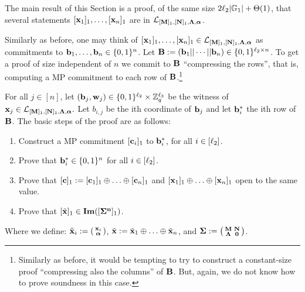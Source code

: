 The main result of this Section is a proof, of the same size $2{\ell_2}|\mathbb{G}_1|+\Theta(1)$, that several statements $[\mathbf{x}_1]_1,\ldots,[\mathbf{x}_n]_1$ are in $\mathcal{L}_{[\mathbf{{M}}]_1,[\mathbf{{N}}]_1,\mathbf{{\Lambda}},{\boldsymbol \alpha}}$.

Similarly as before, one may think of $[\mathbf{x}_1]_1,\ldots,[\mathbf{x}_n]_1\in{\mathcal{L}_{[\mathbf{{M}}]_1,[\mathbf{{N}}]_1,\mathbf{{\Lambda}},{\boldsymbol \alpha}}}$ as commitments to $\mathbf{b}_1,\ldots,\mathbf{b}_n\in\{0,1\}^n$. Let $\mathbf{{B}}:=(\mathbf{b}_1||\cdots||\mathbf{b}_n)\in\{0,1\}^{{\ell_2}\times n}$. To get a proof of size independent of $n$ we commit to $\mathbf{{B}}$ ``compressing the rows'', that is, computing a MP commitment to each row of $\mathbf{{B}}$.\footnote{Similarly as before, it would be tempting to try to construct a constant-size proof ``compressing also the columns'' of $\mathbf{{B}}$. But, again, we do not know how to prove soundness in this case.}
 

For all $j \in [n]$, let $(\mathbf{b}_j,\mathbf{w}_j) \in \{0,1\}^{{\ell_2}} \times \mathbb{Z}_q^{{\ell_3}}$ be the witness of $\mathbf{x}_j \in \mathcal{L}_{[\mathbf{{M}}]_1,[\mathbf{{N}}]_1,\mathbf{{\Lambda}},{\boldsymbol \alpha}}.$ Let $b_{i,j}$ be the ith coordinate of $\mathbf{b}_j$ and let 
 $\mathbf{b}^*_{i}$ the ith row of $\mathbf{{B}}$. The basic steps of the proof are as follows:
\begin{enumerate}
\item Construct a MP commitment $[\mathbf{c}_i]_1$ to $\mathbf{b}^*_i$, for all $i \in [{\ell_2}]$.
\item Prove that $\mathbf{b}^*_i \in \{0,1\}^{n}$ for all $i \in [{\ell_2}]$.
\item Prove that $[\mathbf{c}]_1:=[\mathbf{c}_1]_1 \oplus \ldots \oplus [\mathbf{c}_n]_1$ and $[\mathbf{x}_1]_1 \oplus \ldots \oplus [\mathbf{x}_n]_1$ open to the same value.
\item Prove that $[\tilde{\mathbf{x}}]_1 \in \mathbf{Im}([\mathbf{{\Sigma^n}}]_1)$.
\end{enumerate}
Where we define: $\tilde{\mathbf{x}}_i:=  \left(\begin{smallmatrix}
    \mathbf{x}_i\\
    {\boldsymbol \alpha}
\end{smallmatrix}\right)$, $\tilde{\mathbf{x}}:= \tilde{\mathbf{x}}_1 \oplus 
\ldots \oplus  \tilde{\mathbf{x}}_n$, and
$\mathbf{{\Sigma}}:=\left(\begin{smallmatrix}
    \mathbf{{M}}       & \mathbf{{N}}\\
    \mathbf{{\Lambda}} & \mathbf{{0}}
    \end{smallmatrix}\right)$. 

